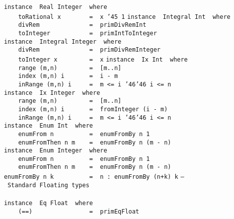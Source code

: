 \eprogB\noindent\bprogB
\mbox{\tt instance\ \ Real\ Integer\ \ where}\\
\mbox{\tt \ \ \ \ toRational\ x\ \ \ \ \ \ \ \ =\ \ x\ {\char'45}\ 1}
\eprogB\noindent\bprogB
\mbox{\tt instance\ \ Integral\ Int\ \ where}\\
\mbox{\tt \ \ \ \ divRem\ \ \ \ \ \ \ \ \ \ \ \ \ \ =\ \ primDivRemInt}\\
\mbox{\tt \ \ \ \ toInteger\ \ \ \ \ \ \ \ \ \ \ =\ \ primIntToInteger}
\eprogB\noindent\bprogB
\mbox{\tt instance\ \ Integral\ Integer\ \ where}\\
\mbox{\tt \ \ \ \ divRem\ \ \ \ \ \ \ \ \ \ \ \ \ \ =\ \ primDivRemInteger}\\
\mbox{\tt \ \ \ \ toInteger\ x\ \ \ \ \ \ \ \ \ =\ \ x}
\eprogB\noindent\bprogB
\mbox{\tt instance\ \ Ix\ Int\ \ where}\\
\mbox{\tt \ \ \ \ range\ (m,n)\ \ \ \ \ \ \ \ \ =\ \ [m..n]}\\
\mbox{\tt \ \ \ \ index\ (m,n)\ i\ \ \ \ \ \ \ =\ \ i\ -\ m}\\
\mbox{\tt \ \ \ \ inRange\ (m,n)\ i\ \ \ \ \ =\ \ m\ <=\ i\ {\char'46}{\char'46}\ i\ <=\ n}
\eprogB\noindent\bprogB
\mbox{\tt instance\ \ Ix\ Integer\ \ where}\\
\mbox{\tt \ \ \ \ range\ (m,n)\ \ \ \ \ \ \ \ \ =\ \ [m..n]}\\
\mbox{\tt \ \ \ \ index\ (m,n)\ i\ \ \ \ \ \ \ =\ \ fromInteger\ (i\ -\ m)}\\
\mbox{\tt \ \ \ \ inRange\ (m,n)\ i\ \ \ \ \ =\ \ m\ <=\ i\ {\char'46}{\char'46}\ i\ <=\ n}
\eprogB\noindent\bprogB
\mbox{\tt instance\ \ Enum\ Int\ \ where}\\
\mbox{\tt \ \ \ \ enumFrom\ n\ \ \ \ \ \ \ \ \ \ =\ \ enumFromBy\ n\ 1}\\
\mbox{\tt \ \ \ \ enumFromThen\ n\ m\ \ \ \ =\ \ enumFromBy\ n\ (m\ -\ n)}
\eprogB\noindent\bprogB
\mbox{\tt instance\ \ Enum\ Integer\ \ where}\\
\mbox{\tt \ \ \ \ enumFrom\ n\ \ \ \ \ \ \ \ \ \ =\ \ enumFromBy\ n\ 1}\\
\mbox{\tt \ \ \ \ enumFromThen\ n\ m\ \ \ \ =\ \ enumFromBy\ n\ (m\ -\ n)}
\eprogB\noindent\bprogB
\mbox{\tt enumFromBy\ n\ k\ \ \ \ \ \ \ \ \ \ =\ \ n\ :\ enumFromBy\ (n+k)\ k}
\eprogB\noindent\bprogB
\mbox{\tt --\ Standard\ Floating\ types}\\
\mbox{\tt }\\
\mbox{\tt instance\ \ Eq\ Float\ \ where}\\
\mbox{\tt \ \ \ \ (==)\ \ \ \ \ \ \ \ \ \ \ \ \ \ \ \ =\ \ primEqFloat}
